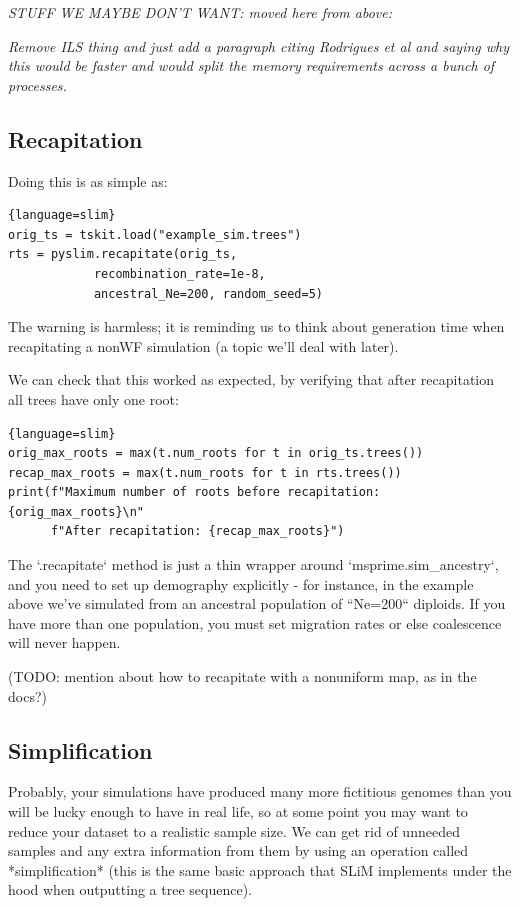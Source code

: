 \documentclass[12pt]{article}
\newcommand{\comment}[1]{\textit{\color{green} #1}}
\begin{document}
\appendix

\comment{STUFF WE MAYBE DON'T WANT: moved here from above:}

\comment{Remove ILS thing and just add a paragraph citing Rodrigues et al and saying why this would be faster and would split the memory requirements across a bunch of processes.}

\subsection*{Recapitation}


Doing this is as simple as:

\begin{lstlisting}{language=slim}
orig_ts = tskit.load("example_sim.trees")
rts = pyslim.recapitate(orig_ts,
            recombination_rate=1e-8,
            ancestral_Ne=200, random_seed=5)
\end{lstlisting}
The warning is harmless; it is reminding us to think about generation time
when recapitating a nonWF simulation (a topic we'll deal with later).

We can check that this worked as expected, by verifying that after recapitation
all trees have only one root:
\begin{lstlisting}{language=slim}
orig_max_roots = max(t.num_roots for t in orig_ts.trees())
recap_max_roots = max(t.num_roots for t in rts.trees())
print(f"Maximum number of roots before recapitation: {orig_max_roots}\n"
      f"After recapitation: {recap_max_roots}")
\end{lstlisting}

The `.recapitate` method
is just a thin wrapper around `msprime.sim\_ancestry`,
and you need to set up demography explicitly - for instance, in the example above
we've simulated from an ancestral population of ``Ne=200`` diploids.
If you have more than one population,
you must set migration rates or else coalescence will never happen.

(TODO: mention about how to recapitate with a nonuniform map, as in the docs?)


\subsection*{Simplification}


Probably, your simulations have produced many more fictitious genomes
than you will be lucky enough to have in real life,
so at some point you may want to reduce your dataset to a realistic sample size.
We can get rid of unneeded samples and any extra information from them by using
an operation called *simplification* (this is the same basic approach that SLiM
implements under the hood when outputting a tree sequence).
\end{document}

